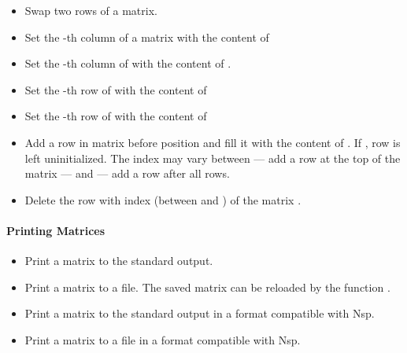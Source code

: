 \begin{itemize}
\item {}
  \sshortdescribe Swap two rows of a matrix.  

\item {}
    \sshortdescribe Set the -th column of a matrix  with the content of 
\item {}
    \sshortdescribe Set the -th column of  with the content of .

\item {}
    \sshortdescribe Set the -th row of  with the content of 
  \item {}
    \sshortdescribe Set the -th row of  with the content of 

\item {}
  \sshortdescribe Add a row in matrix  before position  and fill
  it with the content of . If , row  is left
  uninitialized. The index  may vary between  --- add a row at the
  top of the matrix --- and  --- add a row after all rows.

\item {}
  \sshortdescribe Delete the row with index  (between  and
  ) of the matrix .

\end{itemize}

\paragraph{Printing Matrices}

\begin{itemize}
\item {}
  \sshortdescribe Print a matrix to the standard output.  

\item {}
  \sshortdescribe Print a matrix to a file. The
  saved matrix can be reloaded by the function
  .

\item {}
  \sshortdescribe Print a matrix to the standard output in a format
  compatible with Nsp.  

\item {}
  \sshortdescribe Print a matrix to a file in a format compatible with Nsp.
\end{itemize}

